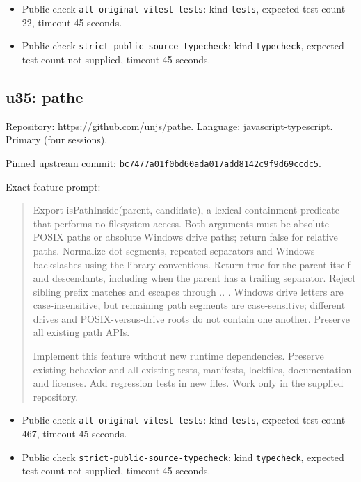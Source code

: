 \documentclass[manuscript,screen,nonacm]{acmart}
\providecommand{\tightlist}{\setlength{\itemsep}{0pt}\setlength{\parskip}{0pt}}
\begin{document}
\begin{itemize}
\tightlist
\item
  Public check \nolinkurl{all-original-vitest-tests}: kind
  \texttt{tests}, expected test count 22, timeout 45 seconds.
\item
  Public check \nolinkurl{strict-public-source-typecheck}: kind
  \texttt{typecheck}, expected test count not supplied, timeout 45
  seconds.
\end{itemize}

\subsection{u35: pathe}\label{u35-pathe}

Repository: \url{https://github.com/unjs/pathe}. Language:
javascript-typescript. Primary (four sessions).

Pinned upstream commit:
\nolinkurl{bc7477a01f0bd60ada017add8142c9f9d69ccdc5}.

Exact feature prompt:

\begin{quote}
Export isPathInside(parent, candidate), a lexical containment predicate
that performs no filesystem access. Both arguments must be absolute
POSIX paths or absolute Windows drive paths; return false for relative
paths. Normalize dot segments, repeated separators and Windows
backslashes using the library conventions. Return true for the parent
itself and descendants, including when the parent has a trailing
separator. Reject sibling prefix matches and escapes through .. .
Windows drive letters are case-insensitive, but remaining path segments
are case-sensitive; different drives and POSIX-versus-drive roots do not
contain one another. Preserve all existing path APIs.

Implement this feature without new runtime dependencies. Preserve
existing behavior and all existing tests, manifests, lockfiles,
documentation and licenses. Add regression tests in new files. Work only
in the supplied repository.
\end{quote}

\begin{itemize}
\tightlist
\item
  Public check \nolinkurl{all-original-vitest-tests}: kind
  \texttt{tests}, expected test count 467, timeout 45 seconds.
\item
  Public check \nolinkurl{strict-public-source-typecheck}: kind
  \texttt{typecheck}, expected test count not supplied, timeout 45
  seconds.
\end{itemize}
\end{document}
